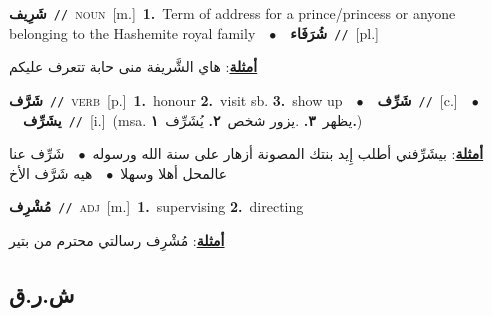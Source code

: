 \documentclass[10pt,a4paper,twoside]{article} %
\begin{document}
\begin{multicols}{2}
{\setlength\topsep{0pt}\textbf{\foreignlanguage{arabic}{شَرِيف}}\ {\color{gray}\texttt{//}\color{black}}\ \textsc{noun}\ [m.]\ \textbf{1.}~Term of address for a prince/princess or anyone belonging to the Hashemite royal family\ \ $\bullet$\ \ \setlength\topsep{0pt}\textbf{\foreignlanguage{arabic}{شُرَفَاء}}\ {\color{gray}\texttt{//}\color{black}}\ [pl.]\  \begin{flushright}\color{gray}\foreignlanguage{arabic}{\textbf{\underline{\foreignlanguage{arabic}{أمثلة}}}: هاي الشَّريفة منى حابة تتعرف عليكم}\end{flushright}\color{black}} \vspace{2mm}

{\setlength\topsep{0pt}\textbf{\foreignlanguage{arabic}{شَرَّف}}\ {\color{gray}\texttt{//}\color{black}}\ \textsc{verb}\ [p.]\ \textbf{1.}~honour  \textbf{2.}~visit sb.  \textbf{3.}~show up\ \ $\bullet$\ \ \setlength\topsep{0pt}\textbf{\foreignlanguage{arabic}{شَرِّف}}\ {\color{gray}\texttt{//}\color{black}}\ [c.]\ \ $\bullet$\ \ \setlength\topsep{0pt}\textbf{\foreignlanguage{arabic}{يشَرِّف}}\ {\color{gray}\texttt{//}\color{black}}\ [i.]\ \color{gray}(msa. \foreignlanguage{arabic}{يظهر}~\foreignlanguage{arabic}{\textbf{٣.}}  .\foreignlanguage{arabic}{يزور شخص}~\foreignlanguage{arabic}{\textbf{٢.}}  \foreignlanguage{arabic}{يُشَرِّف}~\foreignlanguage{arabic}{\textbf{١.}})\color{black}\  \begin{flushright}\color{gray}\foreignlanguage{arabic}{\textbf{\underline{\foreignlanguage{arabic}{أمثلة}}}: بيشَرِّفني أطلب إِيد بنتك المصونة أزهار على سنة الله ورسوله\ $\bullet$\ \  شَرِّف عنا عالمحل أهلا وسهلا\ $\bullet$\ \  هيه شَرَّف الأخ}\end{flushright}\color{black}} \vspace{2mm}

{\setlength\topsep{0pt}\textbf{\foreignlanguage{arabic}{مُشْرِف}}\ {\color{gray}\texttt{//}\color{black}}\ \textsc{adj}\ [m.]\ \textbf{1.}~supervising  \textbf{2.}~directing\  \begin{flushright}\color{gray}\foreignlanguage{arabic}{\textbf{\underline{\foreignlanguage{arabic}{أمثلة}}}: مُشْرِف رسالتي محترم من بتير}\end{flushright}\color{black}} \vspace{2mm}

\vspace{-3mm}
\subsection*{\color{blue}\foreignlanguage{arabic}{ش.ر.ق}\color{blue}{}} 


\end{multicols}
\end{document}
